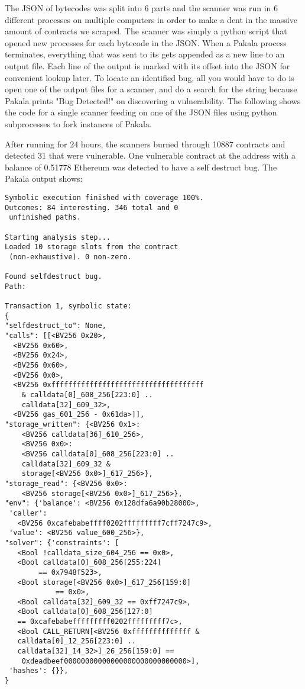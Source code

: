 The JSON of bytecodes was split into 6 parts and the scanner was run in 6 different processes on multiple computers in order to make a dent in the massive amount of contracts we scraped.
The scanner was simply a python script that opened new processes for each bytecode in the JSON.
When a Pakala process terminates, everything that was sent to its  gets appended as a new line to an output file.
Each line of the output is marked with its offset into the JSON for convenient lookup later.
To locate an identified bug, all you would have to do is open one of the output files for a scanner, and do a search for the string  because Pakala prints "Bug Detected!" on discovering a vulnerability.
The following shows the code for a single scanner feeding on one of the JSON files using python subprocesses to fork instances of Pakala.


After running for 24 hours, the scanners burned through 10887 contracts and detected 31 that were vulnerable.
One vulnerable contract at the address  with a balance of 0.51778 Ethereum was detected to have a self destruct bug.
The Pakala output shows:\\

\begin{lstlisting}[basicstyle=\small]
Symbolic execution finished with coverage 100%.
Outcomes: 84 interesting. 346 total and 0 
 unfinished paths.

Starting analysis step...
Loaded 10 storage slots from the contract 
 (non-exhaustive). 0 non-zero.

Found selfdestruct bug.
Path:

Transaction 1, symbolic state:
{
"selfdestruct_to": None,
"calls": [[<BV256 0x20>,
  <BV256 0x60>,
  <BV256 0x24>,
  <BV256 0x60>,
  <BV256 0x0>,
  <BV256 0xffffffffffffffffffffffffffffffffffff 
    & calldata[0]_608_256[223:0] .. 
    calldata[32]_609_32>,
  <BV256 gas_601_256 - 0x61da>]],
"storage_written": {<BV256 0x1>: 
    <BV256 calldata[36]_610_256>, 
    <BV256 0x0>: 
    <BV256 calldata[0]_608_256[223:0] .. 
    calldata[32]_609_32 & 
    storage[<BV256 0x0>]_617_256>},
"storage_read": {<BV256 0x0>: 
    <BV256 storage[<BV256 0x0>]_617_256>},
"env": {'balance': <BV256 0x128dfa6a90b28000>,
 'caller': 
   <BV256 0xcafebabeffff0202fffffffff7cff7247c9>,
 'value': <BV256 value_600_256>},
"solver": {'constraints': [
   <Bool !calldata_size_604_256 == 0x0>,
   <Bool calldata[0]_608_256[255:224] 
        == 0x7948f523>,
   <Bool storage[<BV256 0x0>]_617_256[159:0] 
            == 0x0>,
   <Bool calldata[32]_609_32 == 0xff7247c9>,
   <Bool calldata[0]_608_256[127:0] 
   == 0xcafebabefffffffff0202fffffffff7c>,
   <Bool CALL_RETURN[<BV256 0xffffffffffffff & 
   calldata[0]_12_256[223:0] .. 
   calldata[32]_14_32>]_26_256[159:0] == 
    0xdeadbeef00000000000000000000000000000>],
 'hashes': {}},
}
\end{lstlisting}

